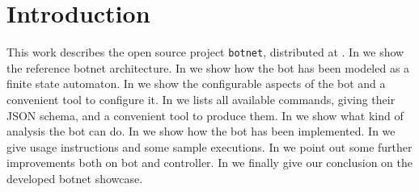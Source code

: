 \section{Introduction}
\label{sec:introduction}

This work describes the open source project \texttt{botnet}, distributed at \cite{project-repo}.
In  we show the reference botnet architecture.
In  we show how the bot has been modeled as a finite state automaton.
In  we show the configurable aspects of the bot and a convenient tool to configure it.
In  we lists all available commands, giving their JSON schema, and a convenient tool to produce them.
In  we show what kind of analysis the bot can do.
In  we show how the bot has been implemented.
In  we give usage instructions and some sample executions.
In  we point out some further improvements both on bot and controller.
In  we finally give our conclusion on the developed botnet showcase.
